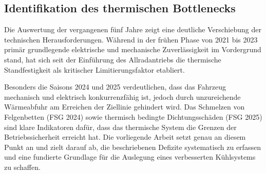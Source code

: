 \subsection{Identifikation des thermischen Bottlenecks}
\label{subsec:bottleneck}

Die Auswertung der vergangenen fünf Jahre zeigt eine deutliche Verschiebung der technischen Herausforderungen. Während in der frühen Phase von 2021 bis 2023 primär grundlegende elektrische und mechanische Zuverlässigkeit im Vordergrund stand, hat sich seit der Einführung des Allradantriebs die thermische Standfestigkeit als kritischer Limitierungsfaktor etabliert.

Besonders die Saisons 2024 und 2025 verdeutlichen, dass das Fahrzeug mechanisch und elektrisch konkurrenzfähig ist, jedoch durch unzureichende Wärmeabfuhr am Erreichen der Ziellinie gehindert wird. Das Schmelzen von Felgenbetten (FSG 2024) sowie thermisch bedingte Dichtungsschäden (FSG 2025) sind klare Indikatoren dafür, dass das thermische System die Grenzen der Betriebssicherheit erreicht hat. Die vorliegende Arbeit setzt genau an diesem Punkt an und zielt darauf ab, die beschriebenen Defizite systematisch zu erfassen und eine fundierte Grundlage für die Auslegung eines verbesserten Kühlsystems zu schaffen.
